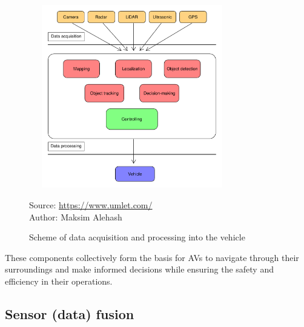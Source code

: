 \documentclass[10pt,oneside,english,a4paper]{article}
\begin{document}
\begin{figure}[!h]
\centering
\includegraphics[width=9cm, height=8cm]{algoritmy.pdf}
\caption{Scheme of data acquisition and processing into the vehicle}
{Source: \url{https://www.umlet.com/}}\\
{Author: Maksim Alehash}
\label{fig:p_algoritmy}
\end{figure}

\par These components collectively form the basis for AVs to navigate through their surroundings and make informed decisions while ensuring the safety and efficiency in their operations.


\subsection{Sensor (data) fusion} \label{fusion}
\end{document}
